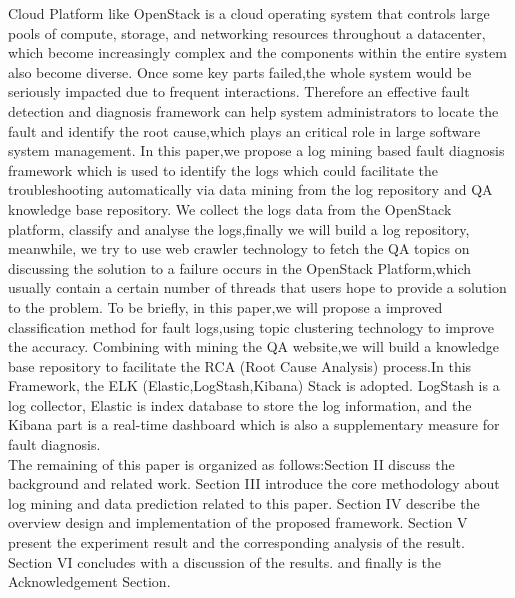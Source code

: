 \setlength{\parindent}{2em}Cloud Platform like OpenStack is a cloud operating system that controls large pools of compute, storage, and networking resources throughout a datacenter, which become increasingly complex and the components within the entire system also become diverse. Once some key parts failed,the whole system would be seriously impacted due to frequent interactions. Therefore an effective fault detection and diagnosis framework can help system administrators to locate the fault and identify the root cause,which plays an critical role in large software system management. In this paper,we propose a log mining based fault diagnosis framework which is used to identify the logs which could facilitate the troubleshooting automatically via data mining from the log repository and QA knowledge base repository. We collect the logs data from the OpenStack platform, classify and analyse the logs,finally we will build a log repository, meanwhile, we try to use web crawler technology to fetch the QA topics on discussing the solution to a failure occurs in the OpenStack Platform,which usually contain a certain number of threads that users hope to provide a solution to the problem. To be briefly, in this paper,we will propose a improved classification method for fault logs,using topic clustering technology to improve the accuracy. Combining with mining the QA website,we will build a knowledge base repository to facilitate the RCA (Root Cause Analysis) process.In this Framework, the ELK (Elastic,LogStash,Kibana) Stack is adopted. LogStash is a log collector, Elastic is index database to store the log information, and the Kibana part is a real-time dashboard which is also a supplementary measure for fault diagnosis. \\

\setlength{\parindent}{2em} The remaining of this paper is organized as follows:Section II discuss the background and  related work. Section III introduce the core methodology about log mining and data prediction related to this paper. Section IV describe the overview design and implementation of the proposed framework. Section V present the experiment result and the corresponding analysis of the result. Section VI concludes with a discussion of the results. and finally is the Acknowledgement Section. 


